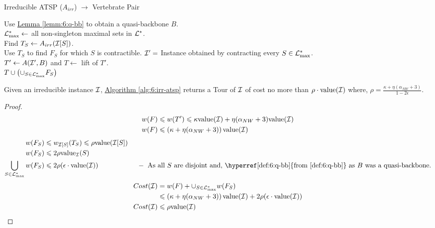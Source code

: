 \documentclass[./main.tex]{subfiles}
\begin{document}
	\begin{algorithm}\label{alg:6:irr-atsp}
		\caption{Irreducible ATSP ($A_{irr}$) $\rightarrow$ Vertebrate Pair}
		Use \hyperref[lemm:6:q-bb]{Lemma \ref{lemm:6:q-bb}} to obtain a quasi-backbone $B$.\\
		$\mathcal{L}^*_{\max} \leftarrow $ all non-singleton maximal sets in $\mathcal{L}^*$.\\
		 {
			Find $T_S \leftarrow A_{irr}(\mathcal{I}[S])$.\\
			Use $T_S$ to find $F_S$ for which $S$ is contractible. 
		}
		$\mathcal{I}' = $ Instance obtained by contracting every $S \in \mathcal{L}^*_{\max}$.\\
		$T' \leftarrow A(\mathcal{I}', B)$ and $T \leftarrow $ lift of $T'$.\\
		\Return $T \cup \left(\cup_{S \in \mathcal{L}^*_{\max}} F_S\right)$
	\end{algorithm}
	
	\begin{theorem}
		Given an irreducible instance $\mathcal{I}$, \hyperref[alg:6:irr-atsp]{Algorithm \ref{alg:6:irr-atsp}} returns a Tour of $\mathcal{I}$ of cost no more than $\rho\cdot\textup{value}(\mathcal{I})$ where, $\rho = \frac{\kappa + \eta(\alpha_{NW} + 3)}{1 - 2\epsilon}$.
	\end{theorem}
	\begin{proof}
		\begin{align*}
			w(F) &\leqslant w(T') \leqslant \kappa\textup{value}(\mathcal{I}) + \eta(\alpha_{NW} + 3)\textup{value}(\mathcal{I}) \\
			w(F) &\leqslant \left(\kappa + \eta(\alpha_{NW} + 3)\right)\textup{value}(\mathcal{I})
		\end{align*}
		\begin{align*}
			w(F_S) &\leqslant w_{\calI[S]}(T_S) \leqslant \rho \val(\calI[S])\\
			w(F_S)&\leqslant 2\rho\val_{\calI}(S)\\
			\bigcup_{S \in \lam^*_{\max}} w(F_S) &\leqslant 2\rho (\epsilon\cdot\val(\calI))  \hspace*{2cm} -  \text{ As all $S$ are disjoint and, \hyperref[def:6:q-bb]{from \ref{def:6:q-bb}} as $B$ was a quasi-backbone.}
		\end{align*}
		\begin{align*}
			Cost(\mathcal{I}) &= w(F) + \cup_{S \in \mathcal{L}^*_{\max}} w(F_S)\\
			&\leqslant \left(\kappa + \eta(\alpha_{NW} + 3)\right)\textup{value}(\mathcal{I}) + 2\rho (\epsilon\cdot \textup{value}(\mathcal{I}))\\
			Cost(\mathcal{I}) &\leqslant \rho\textup{value}(\mathcal{I})
		\end{align*}
		
	\end{proof}
\end{document}
